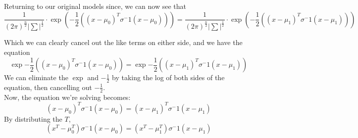 \documentclass[11pt]{article}
\begin{document}
Returning to our original models since, we can now see that
\begin{equation}
\frac{1}{(2\pi) ^ \frac{n}{2}|\sum| ^ \frac{1}{2}} \cdot \exp{(-\frac{1}{2}((x - \mu_0)^T\sigma^-1(x-\mu_0)))} = \frac{1}{(2\pi) ^ \frac{n}{2}|\sum| ^ \frac{1}{2}} \cdot \exp{(-\frac{1}{2}((x - \mu_1)^T\sigma^-1(x-\mu_1)))}
\end{equation}

Which we can clearly cancel out the like terms on either side, and we have the equation
\begin{equation}
\exp{-\frac{1}{2}((x - \mu_0)^T\sigma^-1(x-\mu_0))} = \exp{-\frac{1}{2}((x - \mu_1)^T\sigma^-1(x-\mu_1))}
\end{equation}
We can eliminate the $\exp$ and $-\frac{1}{2}$ by taking the log of both sides of the equation, then cancelling out $-\frac{1}{2}$.\\
Now, the equation we're solving becomes:
\begin{equation}
(x-\mu_0)^T\sigma^-1(x-\mu_0) = (x-\mu_1)^T\sigma^-1(x-\mu_1)
\end{equation}
By distributing the $T$, 
\begin{equation}
(x^T-\mu^T_0)\sigma^-1(x-\mu_0) = (x^T-\mu^T_1)\sigma^-1(x-\mu_1)
\end{equation}
\end{document}
